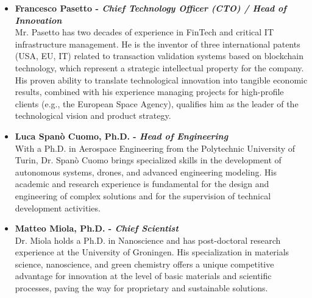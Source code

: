 \begin{itemize}
    \item \textbf{Francesco Pasetto - \textit{Chief Technology Officer (CTO) / Head of Innovation}} \\
    Mr. Pasetto has two decades of experience in FinTech and critical IT infrastructure management. He is the inventor of three international patents (USA, EU, IT) related to transaction validation systems based on blockchain technology, which represent a strategic intellectual property for the company. His proven ability to translate technological innovation into tangible economic results, combined with his experience managing projects for high-profile clients (e.g., the European Space Agency), qualifies him as the leader of the technological vision and product strategy.

    \item \textbf{Luca Spanò Cuomo, Ph.D. - \textit{Head of Engineering}} \\
    With a Ph.D. in Aerospace Engineering from the Polytechnic University of Turin, Dr. Spanò Cuomo brings specialized skills in the development of autonomous systems, drones, and advanced engineering modeling. His academic and research experience is fundamental for the design and engineering of complex solutions and for the supervision of technical development activities.

    \item \textbf{Matteo Miola, Ph.D. - \textit{Chief Scientist}} \\
    Dr. Miola holds a Ph.D. in Nanoscience and has post-doctoral research experience at the University of Groningen. His specialization in materials science, nanoscience, and green chemistry offers a unique competitive advantage for innovation at the level of basic materials and scientific processes, paving the way for proprietary and sustainable solutions.
\end{itemize}

